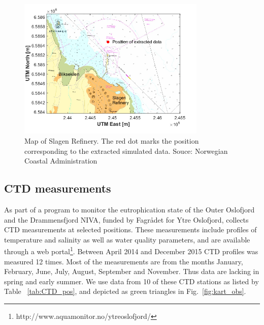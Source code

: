 \clearpage


\begin{figure}[htb]
\centerline{
\includegraphics*[trim=0cm 0cm 1cm 0cm,clip=true,width=0.8\textwidth]{Figurer/Slagen_kart}}
\caption{\small
Map of Slagen Refinery. The red dot marks the position corresponding to the extracted simulated data. Souce: Norwegian Coastal Administration}
\label{fig:Slagen-kart}
\end{figure}

\clearpage
\subsection{CTD measurements}


As part of a program to monitor the eutrophication state of the Outer Oslofjord and the Drammensfjord NIVA, funded by Fagr{\aa}det for Ytre Oslofjord, collects CTD measurements at selected positions. These measurements include profiles of temperature and salinity as well as water quality parameters, and are available through a web portal\footnote{http://www.aquamonitor.no/ytreoslofjord/}. Between April 2014 and December 2015 CTD profiles was measured 12 times. Most of the measurements are from the months January, February, June, July, August, September and November. Thus data are lacking in spring and early summer. We use data from 10 of these CTD stations as listed by Table ~\ref{tab:CTD_pos}, and depicted as green triangles in Fig.~\ref{fig:kart_obs}. 

